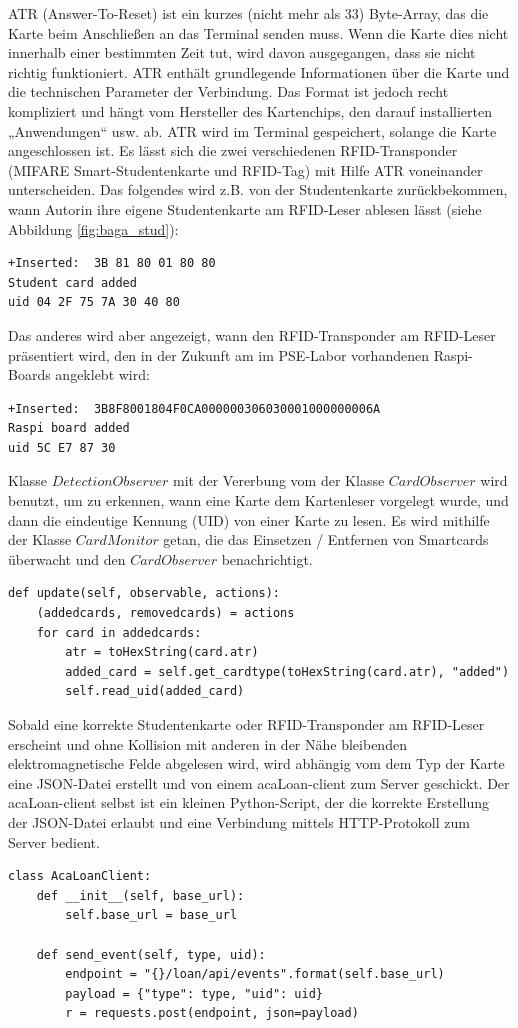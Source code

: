 ATR (Answer-To-Reset) ist ein kurzes (nicht mehr als 33) Byte-Array, das die Karte beim Anschließen an das Terminal senden muss. Wenn die Karte dies nicht innerhalb einer bestimmten Zeit tut, wird davon ausgegangen, dass sie nicht richtig funktioniert. ATR enthält grundlegende Informationen über die Karte und die technischen Parameter der Verbindung. Das Format ist jedoch recht kompliziert und hängt vom Hersteller des Kartenchips, den darauf installierten „Anwendungen“ usw. ab. ATR wird im Terminal gespeichert, solange die Karte angeschlossen ist. Es lässt sich die zwei verschiedenen RFID-Transponder (MIFARE Smart-Studentenkarte und RFID-Tag) mit Hilfe ATR voneinander unterscheiden. Das folgendes wird z.B. von der Studentenkarte zurückbekommen, wann Autorin ihre eigene Studentenkarte am RFID-Leser ablesen lässt (siehe Abbildung \ref{fig:baga_stud}):
\begin{lstlisting}[caption={Abgelesene Studentenkarte},captionpos=b]
+Inserted:  3B 81 80 01 80 80
Student card added
uid 04 2F 75 7A 30 40 80
\end{lstlisting}

Das anderes wird aber angezeigt, wann den RFID-Transponder am RFID-Leser präsentiert wird, den in der Zukunft am im PSE-Labor vorhandenen Raspi-Boards angeklebt wird:
\begin{lstlisting}[caption={Abgelesener Raspi-Tag},captionpos=b]
+Inserted:  3B8F8001804F0CA000000306030001000000006A
Raspi board added
uid 5C E7 87 30
\end{lstlisting}

Klasse $DetectionObserver$ mit der Vererbung vom der Klasse $CardObserver$ wird benutzt, um zu erkennen, wann eine Karte dem Kartenleser vorgelegt wurde, und dann die eindeutige Kennung (UID) von einer Karte zu lesen. Es wird mithilfe der Klasse $ CardMonitor$ getan, die das Einsetzen / Entfernen von Smartcards überwacht und den $CardObserver$ benachrichtigt. 
\begin{lstlisting}[caption={Monitor der angelegte und enfertne Smartkarten},captionpos=b]
def update(self, observable, actions):
	(addedcards, removedcards) = actions
	for card in addedcards:
		atr = toHexString(card.atr)
		added_card = self.get_cardtype(toHexString(card.atr), "added")
		self.read_uid(added_card)
\end{lstlisting}

Sobald eine korrekte Studentenkarte oder RFID-Transponder am RFID-Leser erscheint und ohne Kollision mit anderen in der Nähe bleibenden elektromagnetische Felde abgelesen wird, wird abhängig vom dem Typ der Karte eine JSON-Datei erstellt und von einem acaLoan-client zum Server geschickt. Der acaLoan-client selbst ist ein kleinen Python-Script, der die korrekte Erstellung der JSON-Datei erlaubt und eine Verbindung mittels HTTP-Protokoll zum Server bedient. 
\begin{lstlisting}[caption={acaLoanClient},captionpos=b]
class AcaLoanClient:
	def __init__(self, base_url):
		self.base_url = base_url
	
	def send_event(self, type, uid):
		endpoint = "{}/loan/api/events".format(self.base_url)
		payload = {"type": type, "uid": uid}
		r = requests.post(endpoint, json=payload)
\end{lstlisting}

